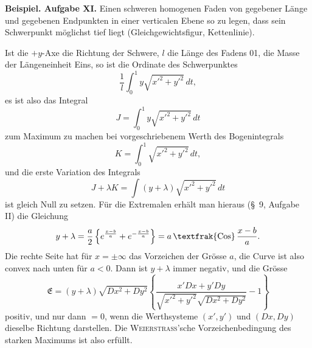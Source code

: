 \documentclass[11pt,a4paper,leqno]{article}
\newcommand{\Cof}{\mathop{\text{\textfrak{Cos}}}\nolimits}
\begin{document}
\noindent\textbf{Beispiel. Aufgabe XI.} Einen schweren homogenen Faden von gegebener Länge und gegebenen Endpunkten in einer verticalen
 Ebene so zu legen, dass sein Schwerpunkt möglichst tief liegt (Gleichgewichtsfigur, Kettenlinie).

Ist die $+y$-Axe die Richtung der Schwere, $l$ die Länge des Fadens 01, die Masse der Längeneinheit Eins, so ist die Ordinate des Schwerpunktes
\[
\frac{1}{l}\int_0^1 y\sqrt{x'^2+y'^2}\,dt,
\]
es ist also das Integral
\[
J=\int_0^1 y\sqrt{x'^2+y'^2}\,dt
\]
zum Maximum zu machen bei vorgeschriebenem Werth des Bogenintegrals
\[
K=\int_0^1 \sqrt{x'^2+y'^2}\,dt,
\]
und die erste Variation des Integrals
\[
J+\lambda K=\int (y+\lambda)\sqrt{x'^2+y'^2}\,dt
\]
ist gleich Null zu setzen. Für die Extremalen erhält man hieraus (\S~9, Aufgabe II) die Gleichung
\[
y+\lambda=\frac{a}{2}\left\{e^{\frac{x-b}{a}}+e^{-\frac{x-b}{a}}\right\}=a\Cof\frac{x-b}{a}.
\]
Die rechte Seite hat für $x=\pm\infty$ das Vorzeichen der Grösse $a$, die Curve ist also convex nach unten für $a<0$. Dann ist $y+\lambda$ immer negativ, und die Grösse
\[
\mathfrak{E}=(y+\lambda)\sqrt{Dx^2+Dy^2}\left\{\frac{x'Dx+y'Dy}{\sqrt{x'^2+y'^2}\sqrt{Dx^2+Dy^2}}-1\right\}
\]
positiv, und nur dann $=0$, wenn die Werthsysteme $(x',y')$ und $(Dx,Dy)$ dieselbe Richtung darstellen. Die \textsc{Weierstrass}'sche Vorzeichenbedingung des starken Maximums ist also erfüllt.
\end{document}
